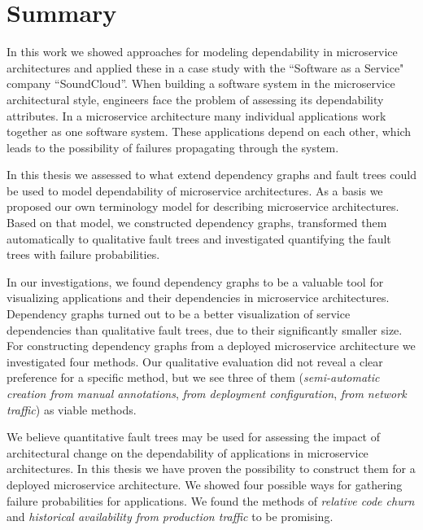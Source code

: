 
\chapter{Summary}
\label{chapter:summary}
In this work we showed approaches for modeling dependability in microservice architectures and applied these in a case study with the ``Software as a Service" company ``SoundCloud''. When building a software system in the microservice architectural style, engineers face the problem of assessing its dependability attributes. In a microservice architecture many individual applications work together as one software system. These applications depend on each other, which leads to the possibility of failures propagating through the system.


In this thesis we assessed to what extend dependency graphs and fault trees could be used to model dependability of microservice architectures. As a basis we proposed our own terminology model for describing microservice architectures. Based on that model, we constructed dependency graphs, transformed them automatically to qualitative fault trees and investigated quantifying the fault trees with failure probabilities.


In our investigations, we found dependency graphs to be a valuable tool for visualizing applications and their dependencies in microservice architectures. Dependency graphs turned out to be a better visualization of service dependencies than qualitative fault trees, due to their significantly smaller size. For constructing dependency graphs from a deployed microservice architecture we investigated four methods. Our qualitative evaluation did not reveal a clear preference for a specific method, but we see three of them (\emph{semi-automatic creation from manual annotations}, \emph{from deployment configuration}, \emph{from network traffic}) as viable methods.

We believe quantitative fault trees may be used for assessing the impact of architectural change on the dependability of applications in microservice architectures. In this thesis we have proven the possibility to construct them for a deployed microservice architecture. We showed four possible ways for gathering failure probabilities for applications. We found the methods of \emph{relative code churn} and \emph{historical availability from production traffic} to be promising.

